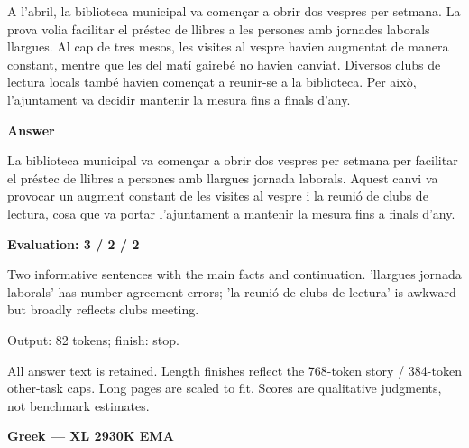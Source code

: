 \documentclass[10pt]{article}
\begin{document}
{\begin{minipage}{\textwidth}
\par\smallskip
A l'abril, la biblioteca municipal va començar a obrir dos vespres per setmana. La prova volia facilitar el préstec de llibres a les persones amb jornades laborals llargues. Al cap de tres mesos, les visites al vespre havien augmentat de manera constant, mentre que les del matí gairebé no havien canviat. Diversos clubs de lectura locals també havien començat a reunir-se a la biblioteca. Per això, l'ajuntament va decidir mantenir la mesura fins a finals d'any.\par\smallskip
\textbf{Answer}\par La biblioteca municipal va començar a obrir dos vespres per setmana per facilitar el préstec de llibres a persones amb llargues jornada laborals. Aquest canvi va provocar un augment constant de les visites al vespre i la reunió de clubs de lectura, cosa que va portar l'ajuntament a mantenir la mesura fins a finals d'any.\par\smallskip
\textbf{Evaluation: 3 / 2 / 2}\par Two informative sentences with the main facts and continuation. 'llargues jornada laborals' has number agreement errors; 'la reunió de clubs de lectura' is awkward but broadly reflects clubs meeting.
\par {\color{gray} Output: 82 tokens; finish: stop.}\par
\medskip\footnotesize All answer text is retained. Length finishes reflect the 768-token story / 384-token other-task caps. Long pages are scaled to fit. Scores are qualitative judgments, not benchmark estimates.
\end{minipage}}%
\noindent\ifdim\dimexpr\ht\languagepage+\dp\languagepage\relax>0.93\textheight%
\resizebox*{!}{0.93\textheight}{\usebox{\languagepage}}%
\else\usebox{\languagepage}\fi%
\clearpage
{\Large\bfseries Greek --- XL 2930K EMA}\par\smallskip
\end{document}
